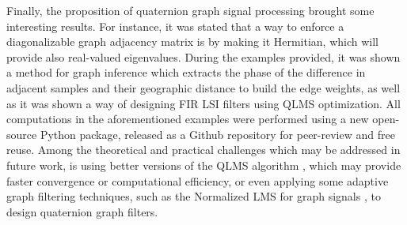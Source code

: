 Finally, the proposition of quaternion graph signal processing brought some interesting results. For instance, it was stated that a way to enforce a diagonalizable graph adjacency matrix is by making it Hermitian, which will provide also real-valued eigenvalues. During the examples provided, it was shown a method for graph inference which extracts the phase of the difference in adjacent samples and their geographic distance to build the edge weights, as well as it was shown a way of designing FIR LSI filters using QLMS optimization. All computations in the aforementioned examples were performed using a new open-source Python package, released as a Github repository for peer-review and free reuse. Among the theoretical and practical challenges which may be addressed in future work, is using better versions of the QLMS algorithm \cite{ogunfunmi2015adaptive}, which may provide faster convergence or computational efficiency, or even applying some adaptive graph filtering techniques, such as the Normalized LMS for graph signals \cite{spelta2020normalized}, to design quaternion graph filters.